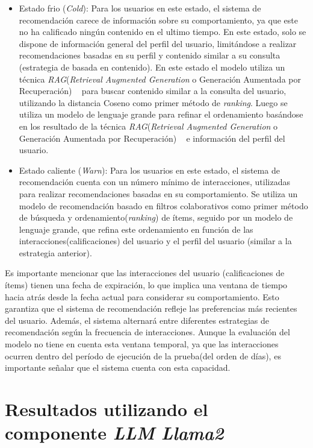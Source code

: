 \documentclass[11pt,a4paper,twoside]{thesis}
\begin{document}
\begin{itemize}
	\item Estado frio (\textit{Cold}): Para los usuarios en este estado, el sistema de recomendación carece de información sobre su comportamiento, ya que este no ha calificado ningún contenido en el ultimo tiempo. En este estado, solo se dispone de información general del perfil del usuario, limitándose a realizar
	      recomendaciones basadas en su perfil y contenido similar a su consulta (estrategia de basada en contenido). En este estado el modelo utiliza un técnica \textit{RAG}(\textit{Retrieval Augmented Generation} o Generación Aumentada por Recuperación) ~\cite{rag} para buscar contenido similar a la consulta del usuario, utilizando la distancia Coseno como primer método de \textit{ranking}. Luego se utiliza un modelo de lenguaje grande para refinar el ordenamiento basándose en los resultado de la técnica \textit{RAG}(\textit{Retrieval Augmented Generation} o Generación Aumentada por Recuperación) ~\cite{rag} e información del perfil del usuario.
	\item Estado caliente (\textit{Warn}): Para los usuarios en este estado, el sistema de recomendación cuenta con un número mínimo de interacciones, utilizadas para realizar recomendaciones basadas en su comportamiento. Se utiliza un modelo de recomendación basado en filtros colaborativos como primer método de búsqueda y ordenamiento(\textit{ranking}) de ítems, seguido por un modelo de lenguaje grande, que refina este ordenamiento en función de las interacciones(calificaciones) del usuario y el perfil del usuario (similar a la estrategia anterior).
\end{itemize}

Es importante mencionar que las interacciones del usuario (calificaciones de ítems) tienen una fecha de expiración, lo que implica una ventana de tiempo hacia atrás desde la fecha actual para considerar su comportamiento. Esto garantiza que el sistema de recomendación refleje las preferencias más recientes del usuario. Además, el sistema alternará entre diferentes estrategias de recomendación según la frecuencia de interacciones. Aunque la evaluación del modelo no tiene en cuenta esta ventana temporal, ya que las interacciones ocurren dentro del período de ejecución de la prueba(del orden de días), es importante señalar que el sistema cuenta con esta capacidad.

\chapter{Resultados utilizando el componente \textit{LLM} \textit{Llama2}}
\end{document}
